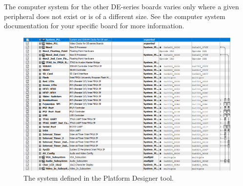 \documentclass[11pt, twoside, pdftex]{article}
\begin{document}
The computer system for the other DE-series boards varies only where a given peripheral does not exist or is of a different size. See the computer system documentation for your specific board for more information.
 
\begin{figure}[H]
   \begin{center}
      \includegraphics[scale=0.6]{figures/figure2.png}
   \caption{The system defined in the Platform Designer tool.} 
	 \label{fig:2}
	 \end{center}
\end{figure}
\end{document}
